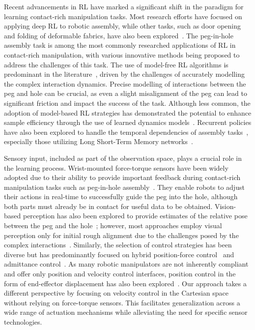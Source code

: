 Recent advancements in RL have marked a significant shift in the paradigm for learning contact-rich manipulation tasks. Most research efforts have focused on applying deep RL to robotic assembly, while other tasks, such as door opening and folding of deformable fabrics, have also been explored~\cite{elguea2023review}. The peg-in-hole assembly task is among the most commonly researched applications of RL in contact-rich manipulation, with various innovative methods being proposed to address the challenges of this task. The use of model-free RL algorithms is predominant in the literature~\cite{inoue2017deep,beltran2020variable,li2022multiple,wang2022deep}, driven by the challenges of accurately modelling the complex interaction dynamics. Precise modelling of interactions between the peg and hole can be crucial, as even a slight misalignment of the peg can lead to significant friction and impact the success of the task. Although less common, the adoption of model-based RL strategies has demonstrated the potential to enhance sample efficiency through the use of learned dynamics models~\cite{luo2018deep,thomas2018learning,ding2019transferable}. Recurrent policies have also been explored to handle the temporal dependencies of assembly tasks~\cite{inoue2017deep,wang2022deep}, especially those utilizing Long Short-Term Memory networks~\cite{hochreiter1997long}.

Sensory input, included as part of the observation space, plays a crucial role in the learning process. Wrist-mounted force-torque sensors have been widely adopted due to their ability to provide important feedback during contact-rich manipulation tasks such as peg-in-hole assembly~\cite{inoue2017deep,beltran2020variable,luo2018deep,thomas2018learning,ding2019transferable}. They enable robots to adjust their actions in real-time to successfully guide the peg into the hole, although both parts must already be in contact for useful data to be obtained. Vision-based perception has also been explored to provide estimates of the relative pose between the peg and the hole~\cite{wang2022deep}; however, most approaches employ visual perception only for initial rough alignment due to the challenges posed by the complex interactions~\cite{thomas2018learning,ding2019transferable}. Similarly, the selection of control strategies has been diverse but has predominantly focused on hybrid position-force control~\cite{inoue2017deep,beltran2020variable} and admittance control~\cite{luo2018deep}. As many robotic manipulators are not inherently compliant and offer only position and velocity control interfaces, position control in the form of end-effector displacement has also been explored~\cite{wang2022deep,ding2019transferable}. Our approach takes a different perspective by focusing on velocity control in the Cartesian space without relying on force-torque sensors. This facilitates generalization across a wide range of actuation mechanisms while alleviating the need for specific sensor technologies.

